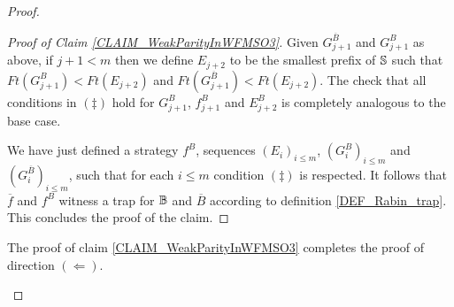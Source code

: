\begin{proof}
\begin{Iff-LR}
\begin{proof}[Proof of Claim \ref{CLAIM_WeakParityInWFMSO3}]


Given $G_{j+1}^{\overline{B}}$ and $G_{j+1}^B$ as above, if $j+1 < m$ then we define $E_{j+2}$ to be the smallest prefix of $\mathbb{S}$ such that $\mathit{Ft}(G_{j+1}^B) < \mathit{Ft}(E_{j+2})$ and $\mathit{Ft}(G_{j+1}^{\overline{B}}) < \mathit{Ft}(E_{j+2})$. The check that all conditions in $(\ddag)$ hold for $G_{j+1}^{B}$, $f_{j+1}^{B}$ and $E_{j+2}^{B}$ is completely analogous to the base case.

We have just defined a strategy $f^{B}$, sequences $(E_i)_{i\leq m}$, $(G_i^{B})_{i\leq m}$ and $(G_i^{\overline{B}})_{i\leq m}$, such that for each $i \leq m$ condition $(\ddag)$ is respected. It follows that $\overline{f}$ and $f^{B}$ witness a trap for $\mathbb{B}$ and $\overline{B}$ according to definition \ref{DEF_Rabin_trap}. This concludes the proof of the claim.
\end{proof}

The proof of claim \ref{CLAIM_WeakParityInWFMSO3} completes the proof of direction $(\Leftarrow)$.

\end{Iff-LR}

\end{proof} 